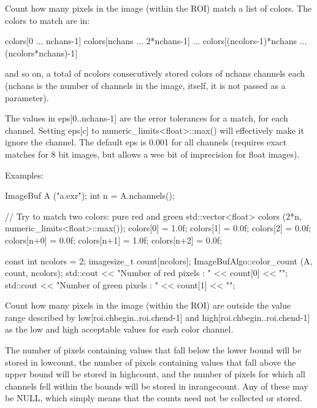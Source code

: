 Count how many pixels in the image (within the ROI) match a list of colors.
The colors to match are in:

\begin{code}
  colors[0 ... nchans-1]
  colors[nchans ... 2*nchans-1]
  ...
  colors[(ncolors-1)*nchans ... (ncolors*nchans)-1]
\end{code}

\noindent and so on, a total of {\cf ncolors} consecutively stored
colors of {\cf nchans} channels each ({\cf nchans} is the number of
channels in the image, itself, it is not passed as a parameter).

The values in {\cf eps[0..nchans-1]} are the error tolerances for a
match, for each channel.  Setting {\cf eps[c]} to
{\cf numeric_limits<float>::max()} will effectively make it ignore the
channel.  The default {\cf eps} is 0.001
for all channels (requires exact matches for 8 bit images, but
allows a wee bit of imprecision for {\cf float} images).

\smallskip
\noindent Examples:
\begin{code}
    ImageBuf A ("a.exr");
    int n = A.nchannels();

    // Try to match two colors: pure red and green
    std::vector<float> colors (2*n, numeric_limits<float>::max());
    colors[0] = 1.0f; colors[1] = 0.0f; colors[2] = 0.0f;
    colors[n+0] = 0.0f; colors[n+1] = 1.0f; colors[n+2] = 0.0f;

    const int ncolors = 2;
    imagesize_t count[ncolors];
    ImageBufAlgo::color_count (A, count, ncolors);
    std::cout << "Number of red pixels   : " << count[0] << "\n";
    std::cout << "Number of green pixels : " << count[1] << "\n";
\end{code}
\apiend


 

Count how many pixels in the image (within the ROI) are outside the
value range described by {\cf low[roi.chbegin..roi.chend-1]} and
{\cf high[roi.chbegin..roi.chend-1]} 
as the low and high acceptable values for each color channel.  

The number of pixels containing values that fall below the lower bound
will be stored in {\cf *lowcount}, the number of pixels containing
values that fall above the upper bound will be stored in 
{\cf *highcount}, and the number of pixels for which all channels fell
within the bounds will be stored in {\cf *inrangecount}.  Any of these
may be NULL, which simply means that the counts need not be collected or
stored.

